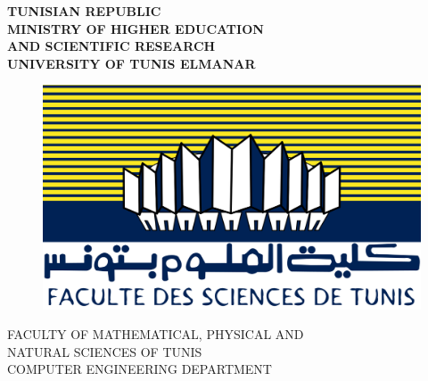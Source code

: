 \documentclass[a4paper,12pt,times,numbered,print,index]{report}
\begin{document}
    \thispagestyle{empty}

    \begin{center}

        \large{ { \bf TUNISIAN REPUBLIC}} \\

        \large{ { \bf MINISTRY OF HIGHER EDUCATION }} \\

        \large{ { \bf AND SCIENTIFIC RESEARCH}} \\

        \large{ { \bf UNIVERSITY OF TUNIS ELMANAR}} \\

    \end{center}


    \begin{figure}[htb]
        \begin{center}
            \includegraphics[scale=0.07]{figs/fst.png}
        \end{center}
    \end{figure}


    \begin{center}
        {  FACULTY OF MATHEMATICAL, PHYSICAL AND } \\

        {  NATURAL SCIENCES OF TUNIS } \\

        {  COMPUTER ENGINEERING DEPARTMENT } \\

    \end{center}
\end{document}
